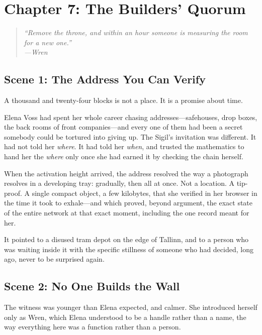 \hypertarget{chapter-7-the-builders-quorum}{%
\section{Chapter 7: The Builders'
Quorum}\label{chapter-7-the-builders-quorum}}

\begin{quote}
\itshape ``Remove the throne, and within an hour someone is measuring the room
for a new one.''\\
\normalfont\hfill---Wren
\end{quote}

\hypertarget{scene-1-the-address-you-can-verify}{%
\subsection{Scene 1: The Address You Can
Verify}\label{scene-1-the-address-you-can-verify}}

A thousand and twenty-four blocks is not a place. It is a promise about time.

Elena Voss had spent her whole career chasing addresses---safehouses, drop
boxes, the back rooms of front companies---and every one of them had been a
secret somebody could be tortured into giving up. The Sigil's invitation was
different. It had not told her \emph{where}. It had told her \emph{when}, and
trusted the mathematics to hand her the \emph{where} only once she had earned
it by checking the chain herself.

When the activation height arrived, the address resolved the way a photograph
resolves in a developing tray: gradually, then all at once. Not a location. A
tip-proof. A single compact object, a few kilobytes, that she verified in her
browser in the time it took to exhale---and which proved, beyond argument, the
exact state of the entire network at that exact moment, including the one
record meant for her.

It pointed to a disused tram depot on the edge of Tallinn, and to a person who
was waiting inside it with the specific stillness of someone who had decided,
long ago, never to be surprised again.

\hypertarget{scene-2-no-one-builds-the-wall}{%
\subsection{Scene 2: No One Builds the
Wall}\label{scene-2-no-one-builds-the-wall}}

The witness was younger than Elena expected, and calmer. She introduced herself
only as Wren, which Elena understood to be a handle rather than a name, the way
everything here was a function rather than a person.

